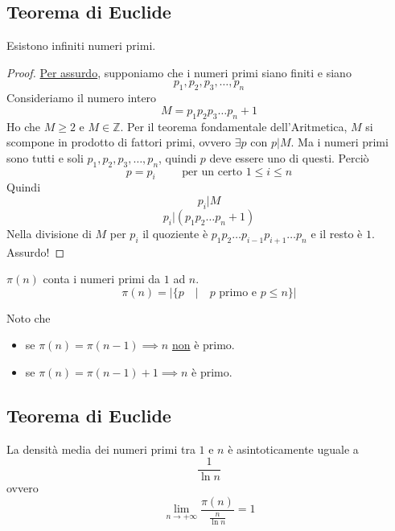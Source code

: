 \documentclass[a4paper,12pt, oneside]{book}
\begin{document}
\subsection{Teorema di Euclide}
\begin{teorema}
	Esistono infiniti numeri primi.

	\begin{proof}
		\underline{Per assurdo}, supponiamo che i numeri primi siano finiti e siano
		$$p_1, p_2, p_3, \dots, p_n$$
		Consideriamo il numero intero
		$$M = p_1p_2p_3 \dots p_n +1$$
		Ho che $M \geq 2$ e $M \in \mathbb{Z}$.
		Per il teorema fondamentale dell'Aritmetica, $M$ si scompone in prodotto di fattori primi, ovvero $\exists p$ con $p|M$.
		Ma i numeri primi sono tutti e soli $p_1, p_2, p_3, \dots, p_n$, quindi $p$ deve essere uno di questi.
		Perciò
		$$p=p_i \qquad \mbox{ per un certo } 1 \leq i \leq n$$
		Quindi
		$$p_i | M$$
		$$p_i | (p_1p_2 \dots p_n+1)$$
		Nella divisione di $M$ per $p_i$ il quoziente è $p_1p_2 \dots p_{i-1} p_{i+1} \dots p_n$ e il resto è $1$.\\
		Assurdo!
	\end{proof}
\end{teorema}

\begin{definizione}
	$\pi(n)$ conta i numeri primi da $1$ ad $n$.
	$$\pi(n) = | \{ p \quad | \quad p \mbox{ primo e } p \leq n \} |$$
\end{definizione}

\begin{nota}
	Noto che \begin{itemize}
		\item se $\pi(n) = \pi(n-1) \implies n$ \underline{non} è primo.
		\item se $\pi(n) = \pi(n-1)+1 \implies n$ è primo.
	\end{itemize}
\end{nota}

\subsection{Teorema di Euclide}
\begin{teorema}
	La densità media dei numeri primi tra $1$ e $n$ è asintoticamente uguale a
	$$\frac{1}{\ln n}$$
	ovvero\\
	$$\lim\limits_{n \to +\infty} \frac{\pi(n)}{\frac{n}{\ln n}} = 1$$
\end{teorema}
\end{document}

